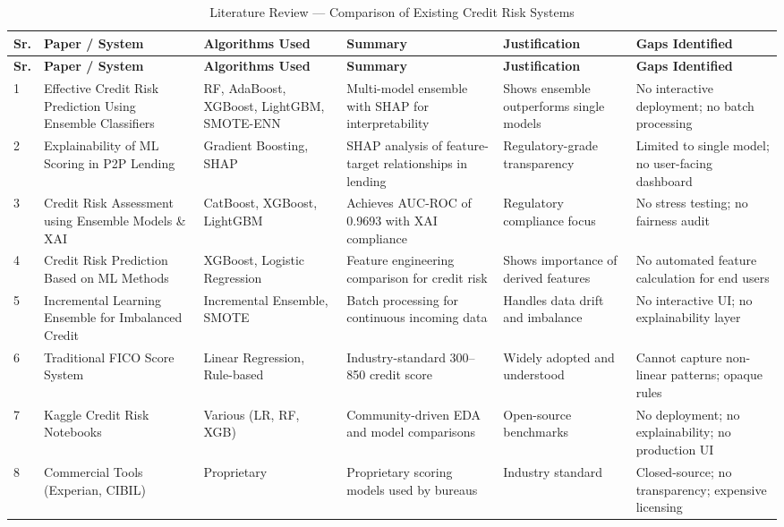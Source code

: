 \documentclass[12pt,a4paper]{report}
\begin{document}
\begin{longtable}{|p{0.6cm}|p{2.5cm}|p{2.3cm}|p{2.3cm}|p{2cm}|p{2.5cm}|}
\caption{Literature Review --- Comparison of Existing Credit Risk Systems}\label{tab:litreview}\\
\hline
\rowcolor{headercolor}
\color{white}\textbf{Sr.} & \color{white}\textbf{Paper / System} & \color{white}\textbf{Algorithms Used} & \color{white}\textbf{Summary} & \color{white}\textbf{Justification} & \color{white}\textbf{Gaps Identified}\\
\hline
\endfirsthead
\hline
\rowcolor{headercolor}
\color{white}\textbf{Sr.} & \color{white}\textbf{Paper / System} & \color{white}\textbf{Algorithms Used} & \color{white}\textbf{Summary} & \color{white}\textbf{Justification} & \color{white}\textbf{Gaps Identified}\\
\hline
\endhead

1 & Effective Credit Risk Prediction Using Ensemble Classifiers~\cite{paper1} & RF, AdaBoost, XGBoost, LightGBM, SMOTE-ENN & Multi-model ensemble with SHAP for interpretability & Shows ensemble outperforms single models & No interactive deployment; no batch processing \\
\hline
2 & Explainability of ML Scoring in P2P Lending~\cite{paper2} & Gradient Boosting, SHAP & SHAP analysis of feature-target relationships in lending & Regulatory-grade transparency & Limited to single model; no user-facing dashboard \\
\hline
3 & Credit Risk Assessment using Ensemble Models \& XAI~\cite{paper3} & CatBoost, XGBoost, LightGBM & Achieves AUC-ROC of 0.9693 with XAI compliance & Regulatory compliance focus & No stress testing; no fairness audit \\
\hline
4 & Credit Risk Prediction Based on ML Methods~\cite{paper4} & XGBoost, Logistic Regression & Feature engineering comparison for credit risk & Shows importance of derived features & No automated feature calculation for end users \\
\hline
5 & Incremental Learning Ensemble for Imbalanced Credit~\cite{paper5} & Incremental Ensemble, SMOTE & Batch processing for continuous incoming data & Handles data drift and imbalance & No interactive UI; no explainability layer \\
\hline
6 & Traditional FICO Score System & Linear Regression, Rule-based & Industry-standard 300--850 credit score & Widely adopted and understood & Cannot capture non-linear patterns; opaque rules \\
\hline
7 & Kaggle Credit Risk Notebooks & Various (LR, RF, XGB) & Community-driven EDA and model comparisons & Open-source benchmarks & No deployment; no explainability; no production UI \\
\hline
8 & Commercial Tools (Experian, CIBIL) & Proprietary & Proprietary scoring models used by bureaus & Industry standard & Closed-source; no transparency; expensive licensing \\
\hline
\end{longtable}
\end{document}
